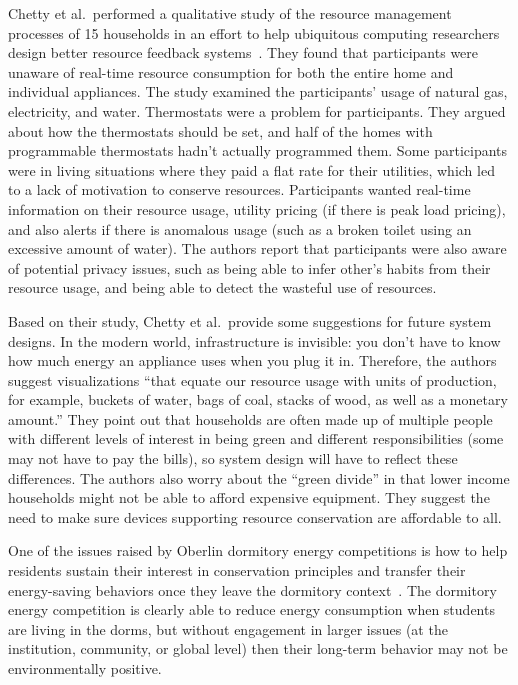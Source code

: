 Chetty et al.\ performed a qualitative study of the resource management processes of 15 households in an effort to help ubiquitous computing researchers design better resource feedback systems~\cite{chetty-2008}. They found that participants were unaware of real-time resource consumption for both the entire home and individual appliances. The study examined the participants' usage of natural gas, electricity, and water. Thermostats were a problem for participants. They argued about how the thermostats should be set, and half of the homes with programmable thermostats hadn't actually programmed them. Some participants were in living situations where they paid a flat rate for their utilities, which led to a lack of motivation to conserve resources. Participants wanted real-time information on their resource usage, utility pricing (if there is peak load pricing), and also alerts if there is anomalous usage (such as a broken toilet using an excessive amount of water). The authors report that participants were also aware of potential privacy issues, such as being able to infer other's habits from their resource usage, and being able to detect the wasteful use of resources.

Based on their study, Chetty et al.\ provide some suggestions for future system designs. In the modern world, infrastructure is invisible: you don't have to know how much energy an appliance uses when you plug it in. Therefore, the authors suggest visualizations ``that equate our resource usage with units of production, for example, buckets of water, bags of coal, stacks of wood, as well as a monetary amount.'' They point out that households are often made up of multiple people with different levels of interest in being green and different responsibilities (some may not have to pay the bills), so system design will have to reflect these differences. The authors also worry about the ``green divide'' in that lower income households might not be able to afford expensive equipment. They suggest the need to make sure devices supporting resource conservation are affordable to all.

One of the issues raised by Oberlin dormitory energy competitions is how to help residents sustain their interest in conservation principles and transfer their energy-saving behaviors once they leave the dormitory context~\cite{Petersen09}. The dormitory energy competition is clearly able to reduce energy consumption when students are living in the dorms, but without engagement in larger issues (at the institution, community, or global level) then their long-term behavior may not be environmentally positive.

